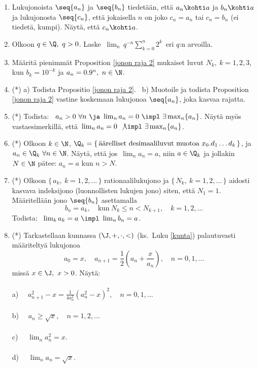\begin{enumerate}
\item
Lukujonoista $\seq{a_n}$ ja $\seq{b_n}$ tiedetään, että $a_n \kohti a$ ja $b_n \kohti a$ ja
lukujonosta $\seq{c_n}$, että jokaisella $n$ on joko $c_n=a_n$ tai $c_n=b_n$ (ei tiedetä, kumpi).
Näytä, että $c_n \kohti a$.

\item
Olkoon $q\in\Q,\ q>0$. Laske $\displaystyle{\ \lim_n\,q^{-n}\sum_{k=0}^n 2^k}\,$ eri $q$:n 
arvoilla.

\item
Määritä pienimmät Proposition \ref{jonon raja 2} mukaiset luvut $N_k,\ k=1,2,3$, kun
$b_k=10^{-k}$ ja $a_n=0.9^n,\ n\in\N$.

\item (*) \label{H-I-6: jonon raja}
a) Todista Propositio \ref{jonon raja 2}. \ b) Muotoile ja todista Proposition
\ref{jonon raja 2} vastine koskemaan lukujonoa $\seq{a_n}$, joka kasvaa rajatta.

\item (*)
Todista: \ $a_n>0\ \forall n\ \ja\ \lim_n a_n = 0\ \impl\ \exists \max_n\{a_n\}$. Näytä myös 
vastaesimerkillä, että $\,\lim_n a_n = 0\ \not\impl\ \exists \max_n\{a_n\}$.

\item (*)
Olkoon $k\in\N$, $\Q_k = \{\,\text{äärelliset desimaaliluvut muotoa}\ x_0.d_1 \ldots d_k\,\}$,
ja $a_n\in\Q_k\ \forall n\in\N$. Näytä, että jos $\,\lim_n a_n=a$, niin $a\in\Q_k$ ja jollakin
$N\in\N$ pätee: $a_n=a$ kun $n>N$. 

\item (*)
Olkoon $\{\,a_k,\ k=1,2, \ldots\,\}$ rationaalilukujono ja $\{\,N_k,\ k=1,2, \ldots\,\}$ aidosti
kasvava indeksijono (luonnollisten lukujen jono) siten, että $N_1=1$. Määritellään jono
$\seq{b_n}$ asettamalla
\[
b_n=a_k, \quad \text{kun}\ N_k \le n < N_{k+1}, \quad k=1,2, \ldots
\]
Todista: \ $\lim_k a_k=a\ \impl\ \lim_n b_n = a$.

\item (*) \label{H-I-6: sqrt-kunta}
Tarkastellaan kunnassa $(\J,+,\cdot,<)$ (ks.\ Luku \ref{kunta}) palautuvasti määriteltyä
lukujonoa
\[
a_0 = x, \quad a_{n+1} = \frac{1}{2}\left(a_n + \frac{x}{a_n}\right), \quad n=0,1, \ldots
\]
missä $x\in\J,\ x>0$. Näytä: \\ \\
a) $\displaystyle{\quad 
      a_{n+1}^2-x = \frac{1}{4a_n^2}\left(a_n^2-x\right)^2, \quad n=0,1, \ldots}$ \\ \\
b) $\quad a_n\ge\sqrt{x}, \quad n=1,2, \ldots$ \\ \\ 
c) $\quad \lim_n a_n^2 = x.$ \\ \\
d) $\quad \lim_n a_n = \sqrt{x}.$

\end{enumerate}
